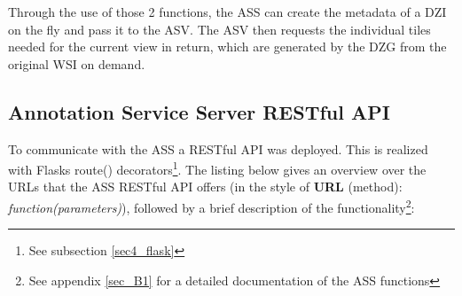 Through the use of those 2 functions, the ASS can create the metadata of a DZI on the fly and pass it to the ASV. The ASV then requests the individual tiles needed for the current view in return, which are generated by the DZG from the original WSI on demand.


\subsection{Annotation Service Server RESTful API}
\label{sec4_api}
To communicate with the ASS a RESTful API was deployed. This is realized with Flasks route() decorators\footnote{See subsection \ref{sec4_flask}}. The listing below gives an overview over the URLs that the ASS RESTful API offers (in the style of \textbf{URL} (method): \emph{function(parameters)}), followed by a brief description of the functionality\footnote{See appendix \ref{sec_B1} for a detailed documentation of the ASS functions}:

